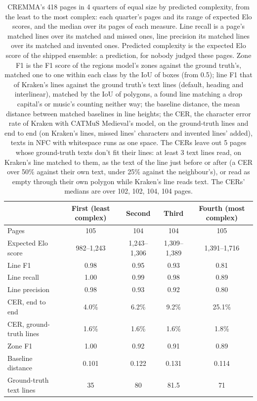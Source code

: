 \begin{table}[htbp]
  \centering
  \caption{CREMMA's 418 pages in 4 quarters of equal size by predicted complexity, from the least to the most complex: each quarter's pages and its range of expected Elo scores, and the median over its pages of each measure. Line recall is a page's matched lines over its matched and missed ones, line precision its matched lines over its matched and invented ones. Predicted complexity is the expected Elo score of the shipped ensemble: a prediction, for nobody judged these pages. Zone F1 is the F1 score of the regions model's zones against the ground truth's, matched one to one within each class by the IoU of boxes (from 0.5); line F1 that of Kraken's lines against the ground truth's text lines (default, heading and interlinear), matched by the IoU of polygons, a found line matching a drop capital's or music's counting neither way; the baseline distance, the mean distance between matched baselines in line heights; the CER, the character error rate of Kraken with CATMuS Medieval's model, on the ground-truth lines and end to end (on Kraken's lines, missed lines' characters and invented lines' added), texts in NFC with whitespace runs as one space. The CERs leave out 5 pages whose ground-truth texts don't fit their lines: at least 3 text lines read, on Kraken's line matched to them, as the text of the line just before or after (a CER over 50\% against their own text, under 25\% against the neighbour's), or read as empty through their own polygon while Kraken's line reads text. The CERs' medians are over 102, 102, 104, 104 pages.}
  \label{tab:difficulty_by_quarter}
  \begin{tabular}{lcccc}
    \toprule
     & First (least complex) & Second & Third & Fourth (most complex) \\
    \midrule
    Pages & 105 & 104 & 104 & 105 \\
    Expected Elo score & 982--1,243 & 1,243--1,306 & 1,309--1,389 & 1,391--1,716 \\
    \midrule
    Line F1 & 0.98 & 0.95 & 0.93 & 0.81 \\
    Line recall & 1.00 & 0.99 & 0.98 & 0.89 \\
    Line precision & 0.98 & 0.93 & 0.92 & 0.80 \\
    CER, end to end & 4.0\% & 6.2\% & 9.2\% & 25.1\% \\
    CER, ground-truth lines & 1.6\% & 1.6\% & 1.6\% & 1.8\% \\
    Zone F1 & 1.00 & 0.92 & 0.91 & 0.89 \\
    Baseline distance & 0.101 & 0.122 & 0.131 & 0.114 \\
    Ground-truth text lines & 35 & 80 & 81.5 & 71 \\
    \bottomrule
  \end{tabular}
\end{table}
